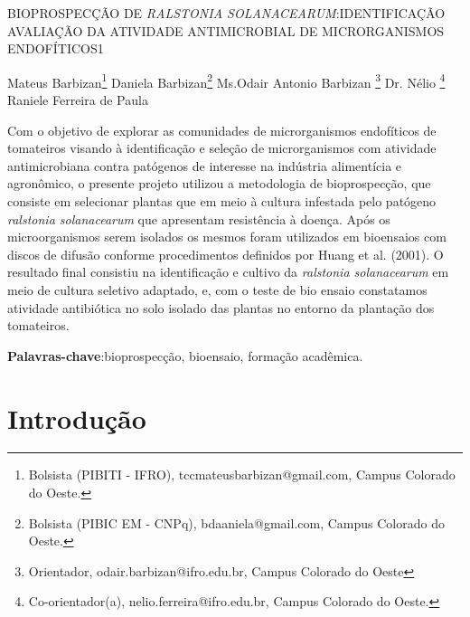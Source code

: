 \documentclass[article,12pt,onesidea,4paper,english,brazil]{abntex2}
\begin{document}
	
	
	\frenchspacing 
	
	\begin{center}
		\LARGE BIOPROSPECÇÃO DE \textit{RALSTONIA SOLANACEARUM}:IDENTIFICAÇÃO AVALIAÇÃO DA ATIVIDADE ANTIMICROBIAL DE MICRORGANISMOS ENDOFÍTICOS1
		
		\normalsize
Mateus Barbizan\footnote{Bolsista (PIBITI - IFRO), tccmateusbarbizan@gmail.com, Campus Colorado do Oeste. } 
Daniela Barbizan\footnote{Bolsista (PIBIC EM - CNPq), bdaaniela@gmail.com, Campus Colorado do Oeste.} 
		Ms.Odair Antonio Barbizan \footnote{Orientador, odair.barbizan@ifro.edu.br, Campus Colorado do Oeste} 
		Dr. Nélio \footnote{Co-orientador(a), nelio.ferreira@ifro.edu.br, Campus Colorado do Oeste.} 
		Raniele Ferreira de Paula
	\end{center}
	
	\begin{resumoumacoluna}
		Com o objetivo de explorar as comunidades de microrganismos endofíticos de tomateiros visando à identificação e seleção de microrganismos com atividade antimicrobiana contra patógenos de interesse na indústria alimentícia e agronômico, o presente projeto utilizou a metodologia de bioprospecção, que consiste em selecionar plantas que em meio à cultura infestada pelo patógeno \textit{ralstonia solanacearum} que apresentam resistência à doença. Após os microorganismos serem isolados os mesmos foram utilizados em bioensaios com discos de difusão conforme procedimentos definidos por Huang et al. (2001). O resultado final consistiu na identificação e cultivo da \textit{ralstonia solanacearum} em meio de cultura seletivo adaptado, e, com o teste de bio ensaio constatamos atividade antibiótica no solo isolado das plantas no entorno da plantação dos tomateiros.
		\vspace{\onelineskip}
		
		\noindent
		\textbf{Palavras-chave}:bioprospecção, bioensaio, formação acadêmica.
	\end{resumoumacoluna}
	
	\textual
	
	\section*{Introdução}
	
\end{document}
